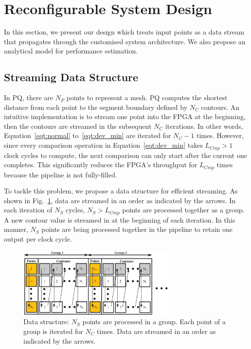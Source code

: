 \section{Reconfigurable System Design}
\label{sec:implementation}

In this section, we present our design which treats input points as a data stream that propagates through the customised system architecture.
We also propose an analytical model for performance estimation.

\subsection{Streaming Data Structure}
In PQ, there are $N_P$ points to represent a mesh.
PQ computes the shortest distance from each point to the segment boundary defined by $N_C$ contours.
An intuitive implementation is to stream one point into the FPGA at the beginning,
then the contours are streamed in the subsequent $N_C$ iterations.
In other words, Equation~\ref{eqt:normal} to~\ref{eqt:dev_min} are iterated for $N_C-1$ times.
However, since every comparison operation in Equation~\ref{eqt:dev_min} takes $L_{Cmp}>1$ clock cycles to compute, the next comparison can only start after the current one completes. 
This significantly reduces the FPGA's throughput for $L_{Cmp}$ times because the pipeline is not fully-filled.

To tackle this problem, we propose a data structure for efficient streaming.
As shown in Fig.~\ref{fig:stream}, data are streamed in an order as indicated by the arrows.
In each iteration of $N_S$ cycles, $N_{S}>L_{Cmp}$ points are processed together as a group.
A new contour value is streamed in at the beginning of each iteration.
In this manner, $N_{S}$ points are being processed together in the pipeline to retain one output per clock cycle.

\begin{figure}[ht]
\begin{center}
\includegraphics[width=0.7\textwidth]{mixed_precision/figures/stream}
\end{center}
\caption{Data structure: 
$N_S$ points are processed in a group. 
Each point of a group is iterated for $N_C$ times.
Data are streamed in an order as indicated by the arrows.}
\label{fig:stream}
\end{figure}

